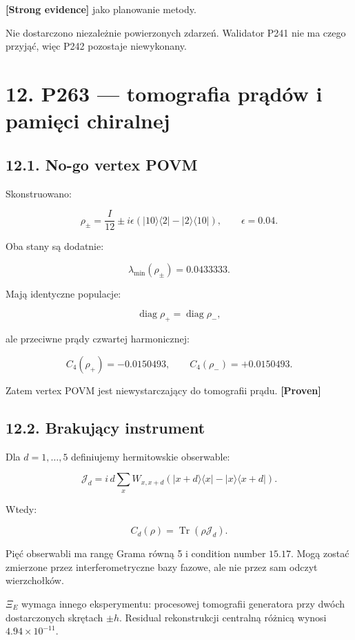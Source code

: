 \documentclass[11pt,a4paper,openany]{report}
\newcommand{\statusProven}{\textcolor{fingreen}{[Proven]}}
\newcommand{\statusStrong}{\textcolor{finblue}{[Strong evidence]}}
\begin{document}
\textbf{\statusStrong{}} jako planowanie metody.

Nie dostarczono niezale\.znie powierzonych zdarzeń. Walidator P241 nie ma czego przyjąć, więc P242 pozostaje niewykonany.

\chapter{12. P263 --- tomografia prądów i pamięci chiralnej}

\section{12.1. No-go vertex POVM}

Skonstruowano:

\[
\rho_\pm
=
\frac{I}{12}
\pm i\epsilon
\left(
|10\rangle\langle2|
-|2\rangle\langle10|
\right),
\qquad \epsilon=0.04.
\]

Oba stany są dodatnie:

\[
\lambda_{\min}(\rho_\pm)=0.0433333.
\]

Mają identyczne populacje:

\[
\operatorname{diag}\rho_+
=
\operatorname{diag}\rho_-,
\]

ale przeciwne prądy czwartej harmonicznej:

\[
C_4(\rho_+)=-0.0150493,
\qquad
C_4(\rho_-)=+0.0150493.
\]

Zatem vertex POVM jest niewystarczający do tomografii prądu. \textbf{\statusProven{}}

\section{12.2. Brakujący instrument}

Dla \(d=1,\ldots,5\) definiujemy hermitowskie obserwable:

\[
\mathcal J_d
=
i\,d\sum_xW_{x,x+d}
\left(
|x+d\rangle\langle x|
-|x\rangle\langle x+d|
\right).
\]

Wtedy:

\[
C_d(\rho)=\operatorname{Tr}(\rho\mathcal J_d).
\]

Pięć obserwabli ma rangę Grama równą 5 i condition number \(15.17\). Mogą zostać zmierzone przez interferometryczne bazy fazowe, ale nie przez sam odczyt wierzchołków.

\(\Xi_E\) wymaga innego eksperymentu: procesowej tomografii generatora przy dwóch dostarczonych skrętach \(\pm h\). Residual rekonstrukcji centralną ró\.znicą wynosi \(4.94\times10^{-11}\).
\end{document}
